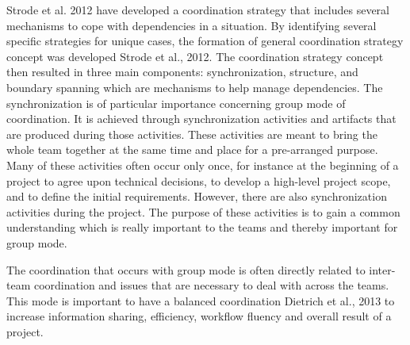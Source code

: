 Strode et al. 2012 have developed a coordination strategy that includes several mechanisms to cope with dependencies in a situation. By identifying several specific strategies for unique cases, the formation of general coordination strategy concept was developed Strode et al., 2012. The coordination strategy concept then resulted in three main components: synchronization, structure, and boundary spanning which are mechanisms to help manage dependencies. The synchronization is of particular importance concerning group mode of coordination. It is achieved through synchronization activities and artifacts that are produced during those activities. These activities are meant to bring the whole team together at the same time and place for a pre-arranged purpose. Many of these activities often occur only once, for instance at the beginning of a project to agree upon technical decisions, to develop a high-level project scope, and to define the initial requirements. However, there are also synchronization activities during the project. The purpose of these activities is to gain a common understanding which is really important to the teams and thereby important for group mode.

The coordination that occurs with group mode is often directly related to inter-team coordination and issues that are necessary to deal with across the teams. This mode is important to have a balanced coordination Dietrich et al., 2013 to increase information sharing, efficiency, workflow fluency and overall result of a project.

